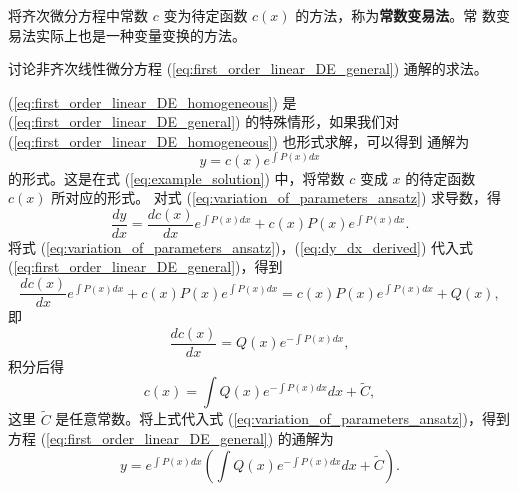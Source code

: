 \begin{definition}[常数变易法]\label{def:常数变易法}
    将齐次微分方程中常数 $c$ 变为待定函数 $c(x)$ 的方法，称为\textbf{常数变易法}。常
数变易法实际上也是一种变量变换的方法。
\end{definition}
\begin{example}
    讨论非齐次线性微分方程 (\ref{eq:first_order_linear_DE_general}) 通解的求法。
\end{example}
\begin{solution}
    (\ref{eq:first_order_linear_DE_homogeneous}) 是 (\ref{eq:first_order_linear_DE_general}) 的特殊情形，如果我们对 (\ref{eq:first_order_linear_DE_homogeneous}) 也形式求解，可以得到
通解为
\begin{equation}
y = c(x)e^{\int P(x)dx} \label{eq:variation_of_parameters_ansatz}
\end{equation}
的形式。这是在式 (\ref{eq:example_solution}) 中，将常数 $c$ 变成 $x$ 的待定函数 $c(x)$ 所对应的形式。
对式 (\ref{eq:variation_of_parameters_ansatz}) 求导数，得
\begin{equation}
\frac{dy}{dx} = \frac{dc(x)}{dx}e^{\int P(x)dx} + c(x)P(x)e^{\int P(x)dx}. \label{eq:dy_dx_derived}
\end{equation}
将式 (\ref{eq:variation_of_parameters_ansatz})，(\ref{eq:dy_dx_derived}) 代入式 (\ref{eq:first_order_linear_DE_general})，得到
$$\frac{dc(x)}{dx}e^{\int P(x)dx} + c(x)P(x)e^{\int P(x)dx} = c(x)P(x)e^{\int P(x)dx} + Q(x),$$
即
$$\frac{dc(x)}{dx} = Q(x)e^{-\int P(x)dx},$$
积分后得
$$c(x) = \int Q(x)e^{-\int P(x)dx} dx + \tilde{C},$$
这里 $\tilde{C}$ 是任意常数。将上式代入式 (\ref{eq:variation_of_parameters_ansatz})，得到方程 (\ref{eq:first_order_linear_DE_general}) 的通解为
\begin{equation}
y = e^{\int P(x)dx}\left(\int Q(x)e^{-\int P(x)dx} dx + \tilde{C}\right). \label{eq:first_order_linear_DE_solution}
\end{equation}
\end{solution}

